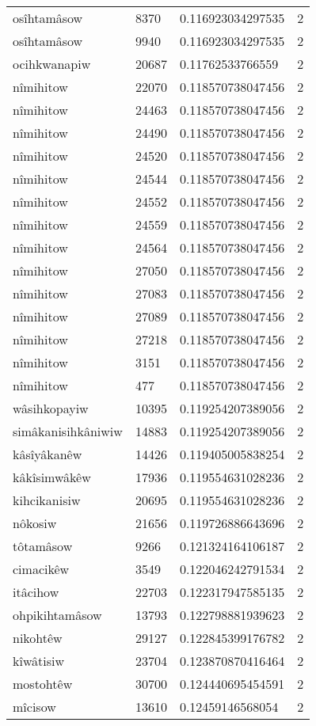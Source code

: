 \begin{longtable}{llll}
osîhtamâsow & 8370 & 0.116923034297535 & 2 \\
osîhtamâsow & 9940 & 0.116923034297535 & 2 \\
ocihkwanapiw & 20687 & 0.11762533766559 & 2 \\
nîmihitow & 22070 & 0.118570738047456 & 2 \\
nîmihitow & 24463 & 0.118570738047456 & 2 \\
nîmihitow & 24490 & 0.118570738047456 & 2 \\
nîmihitow & 24520 & 0.118570738047456 & 2 \\
nîmihitow & 24544 & 0.118570738047456 & 2 \\
nîmihitow & 24552 & 0.118570738047456 & 2 \\
nîmihitow & 24559 & 0.118570738047456 & 2 \\
nîmihitow & 24564 & 0.118570738047456 & 2 \\
nîmihitow & 27050 & 0.118570738047456 & 2 \\
nîmihitow & 27083 & 0.118570738047456 & 2 \\
nîmihitow & 27089 & 0.118570738047456 & 2 \\
nîmihitow & 27218 & 0.118570738047456 & 2 \\
nîmihitow & 3151 & 0.118570738047456 & 2 \\
nîmihitow & 477 & 0.118570738047456 & 2 \\
wâsihkopayiw & 10395 & 0.119254207389056 & 2 \\
simâkanisihkâniwiw & 14883 & 0.119254207389056 & 2 \\
kâsîyâkanêw & 14426 & 0.119405005838254 & 2 \\
kâkîsimwâkêw & 17936 & 0.119554631028236 & 2 \\
kihcikanisiw & 20695 & 0.119554631028236 & 2 \\
nôkosiw & 21656 & 0.119726886643696 & 2 \\
tôtamâsow & 9266 & 0.121324164106187 & 2 \\
cimacikêw & 3549 & 0.122046242791534 & 2 \\
itâcihow & 22703 & 0.122317947585135 & 2 \\
ohpikihtamâsow & 13793 & 0.122798881939623 & 2 \\
nikohtêw & 29127 & 0.122845399176782 & 2 \\
kîwâtisiw & 23704 & 0.123870870416464 & 2 \\
mostohtêw & 30700 & 0.124440695454591 & 2 \\
mîcisow & 13610 & 0.12459146568054 & 2 \\

\end{longtable}
